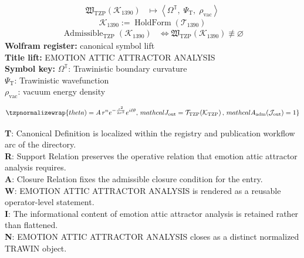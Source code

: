 \noindent
\begin{minipage}[t]{0.48\linewidth}
\begingroup
\small
\[
\begin{aligned}
\mathfrak{W}_{\mathrm{TZP}}\!\left(\mathcal{K}_{1390}\right)
&\longmapsto
\left\langle \Omega^{\mathbb{T}},\; \Psi_{\mathrm{T}},\; \rho_{\mathrm{vac}} \right\rangle
\end{aligned}
\]
\[
\mathcal{K}_{1390}
:=
\operatorname{HoldForm}\!\left(\mathcal{T}_{1390}\right)
\]
\[
\begin{aligned}
\operatorname{Admissible}_{\mathrm{TZP}}\!\left(\mathcal{K}_{1390}\right)
&\Longleftrightarrow
\mathfrak{W}_{\mathrm{TZP}}\!\left(\mathcal{K}_{1390}\right)\not\equiv\varnothing
\end{aligned}
\]
\textbf{Wolfram register:} canonical symbol lift\\
\textbf{Title lift:} EMOTION ATTIC ATTRACTOR ANALYSIS\\
\textbf{Symbol key:} \(\Omega^{\mathbb{T}}\): Trawinistic boundary curvature\\ \(\Psi_{\mathrm{T}}\): Trawinistic wavefunction\\ \(\rho_{\mathrm{vac}}\): vacuum energy density
\par
\endgroup
\end{minipage}\hfill
\begin{minipage}[t]{0.48\linewidth}
\[
\tzpnormalizewrap{theta) = A \, r^n e^{-\frac{r^2}{2\sigma^2}} e^{i \ell \theta},\,mathcal{J}_{\mathrm{out}} = \mathcal{T}_{\mathrm{TZP}}\!\left(\mathcal{K}_{\mathrm{TZP}}\right),\,mathcal{A}_{\mathrm{adm}}\!\left(\mathcal{J}_{\mathrm{out}}\right)=1}
\]

\small
\textbf{T}: Canonical Definition is localized within the registry and publication workflow arc of the directory.\\
\textbf{R}: Support Relation preserves the operative relation that emotion attic attractor analysis requires.\\
\textbf{A}: Closure Relation fixes the admissible closure condition for the entry.\\
\textbf{W}: EMOTION ATTIC ATTRACTOR ANALYSIS is rendered as a reusable operator-level statement.\\
\textbf{I}: The informational content of emotion attic attractor analysis is retained rather than flattened.\\
\textbf{N}: EMOTION ATTIC ATTRACTOR ANALYSIS closes as a distinct normalized TRAWIN object.
\normalsize
\end{minipage}

